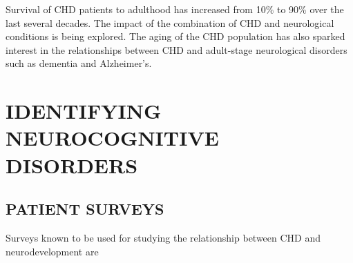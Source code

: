 
Survival of CHD patients to adulthood has increased from 10\% to 90\% over the last several decades. The impact of the combination of CHD and neurological conditions is being explored. The aging of the CHD population has also sparked interest in the relationships between CHD and adult-stage neurological disorders such as dementia and Alzheimer's. 




\section{IDENTIFYING NEUROCOGNITIVE DISORDERS}

\subsection{PATIENT SURVEYS}

Surveys known to be used for studying the relationship between CHD and neurodevelopment are

